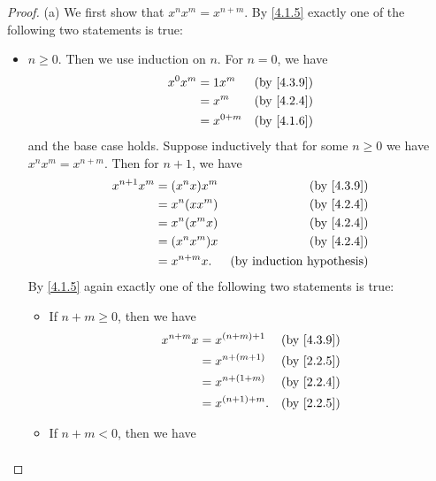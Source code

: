 \begin{proof}{(a)}
  We first show that \(x^n x^m = x^{n + m}\).
  By \cref{4.1.5} exactly one of the following two statements is true:
  \begin{itemize}
    \item \(n \geq 0\).
          Then we use induction on \(n\).
          For \(n = 0\), we have
          \begin{align*}
            x^0 x^m & = 1x^m      & \text{(by \cref{4.3.9})} \\
                    & = x^m       & \text{(by \cref{4.2.4})} \\
                    & = x^{0 + m} & \text{(by \cref{4.1.6})}
          \end{align*}
          and the base case holds.
          Suppose inductively that for some \(n \geq 0\) we have \(x^n x^m = x^{n + m}\).
          Then for \(n + 1\), we have
          \begin{align*}
            x^{n + 1} x^m & = (x^n x) x^m  & \text{(by \cref{4.3.9})}         \\
                          & = x^n (x x^m)  & \text{(by \cref{4.2.4})}         \\
                          & = x^n (x^m x)  & \text{(by \cref{4.2.4})}         \\
                          & = (x^n x^m) x  & \text{(by \cref{4.2.4})}         \\
                          & = x^{n + m} x. & \text{(by induction hypothesis)}
          \end{align*}
          By \cref{4.1.5} again exactly one of the following two statements is true:
          \begin{itemize}
            \item If \(n + m \geq 0\), then we have
                  \begin{align*}
                    x^{n + m} x & = x^{(n + m) + 1}  & \text{(by \cref{4.3.9})} \\
                                & = x^{n + (m + 1)}  & \text{(by \cref{2.2.5})} \\
                                & = x^{n + (1 + m)}  & \text{(by \cref{2.2.4})} \\
                                & = x^{(n + 1) + m}. & \text{(by \cref{2.2.5})}
                  \end{align*}
            \item If \(n + m < 0\), then we have
                  \begin{align*}

\end{align*}
\end{itemize}
\end{itemize}
\end{proof}
